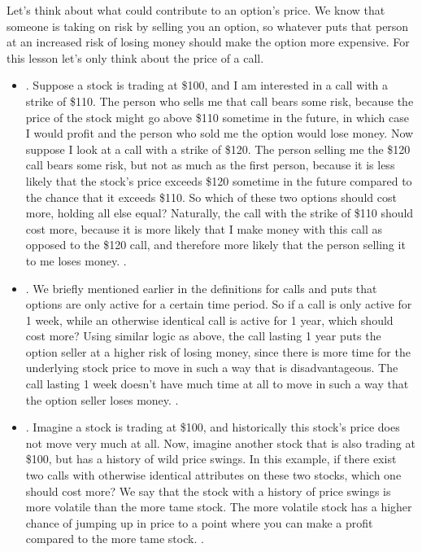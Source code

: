\documentclass[letterpaper,10pt,english]{jupyterBook}
\begin{document}
\sphinxAtStartPar
Let’s think about what could contribute to an option’s price. We know that someone is taking on risk by selling you an option, so whatever puts that person at an increased risk of losing money should make the option more expensive. For this lesson let’s only think about the price of a call.
\begin{itemize}
\item {} 
\sphinxAtStartPar
{}. Suppose a stock is trading at \$100, and I am interested in a call with a strike of \$110. The person who sells me that call bears some risk, because the price of the stock might go above \$110 sometime in the future, in which case I would profit and the person who sold me the option would lose money. Now suppose I look at a call with a strike of \$120. The person selling me the \$120 call bears some risk, but not as much as the first person, because it is less likely that the stock’s price exceeds \$120 sometime in the future compared to the chance that it exceeds \$110. So which of these two options should cost more, holding all else equal? Naturally, the call with the strike of \$110 should cost more, because it is more likely that I make money with this call as opposed to the \$120 call, and therefore more likely that the person selling it to me loses money. .

\item {} 
\sphinxAtStartPar
{}. We briefly mentioned earlier in the definitions for calls and puts that options are only active for a certain time period. So if a call is only active for 1 week, while an otherwise identical call is active for 1 year, which should cost more? Using similar logic as above, the call lasting 1 year puts the option seller at a higher risk of losing money, since there is more time for the underlying stock price to move in such a way that is disadvantageous. The call lasting 1 week doesn’t have much time at all to move in such a way that the option seller loses money. .

\item {} 
\sphinxAtStartPar
{}. Imagine a stock is trading at \$100, and historically this stock’s price does not move very much at all. Now, imagine another stock that is also trading at \$100, but has a history of wild price swings. In this example, if there exist two calls with otherwise identical attributes on these two stocks, which one should cost more? We say that the stock with a history of price swings is more volatile than the more tame stock. The more volatile stock has a higher chance of jumping up in price to a point where you can make a profit compared to the more tame stock. .


\end{itemize}
\end{document}
